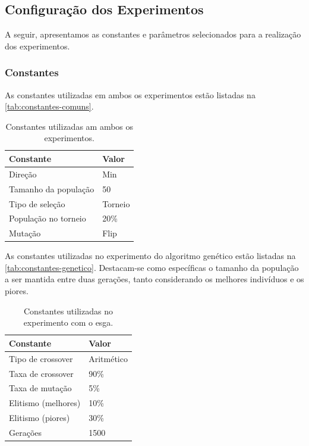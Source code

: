 \subsection{Configuração dos Experimentos}

A seguir, apresentamos as constantes e parâmetros selecionados para a realização dos experimentos.

\subsubsection{Constantes}

As constantes utilizadas em ambos os experimentos estão listadas na \autoref{tab:constantes-comuns}.

\begin{table}[htb]
    \center%
    \begin{tabular}{l l}
        \bottomrule
        \textbf{Constante}   & \textbf{Valor} \\ \midrule
        Direção              & Min            \\ \midrule
        Tamanho da população & 50             \\ \midrule
        Tipo de seleção      & Torneio        \\ \midrule
        População no torneio & 20\%           \\
        \midrule
        Mutação              & Flip           \\ \midrule
    \end{tabular}
    \caption{Constantes utilizadas am ambos os experimentos.}%
    \label{tab:constantes-comuns}
\end{table}

As constantes utilizadas no experimento do algoritmo genético estão listadas na \autoref{tab:constantes-genetico}.
Destacam-se como específicas o tamanho da população a ser mantida entre duas gerações, tanto considerando os melhores indivíduos e os piores.

\begin{table}[htb]
    \center%
    \begin{tabular}{l l}
        \bottomrule
        \textbf{Constante}  & \textbf{Valor} \\ \midrule
        Tipo de crossover   & Aritmético     \\ \midrule
        Taxa de crossover   & 90\%           \\ \midrule
        Taxa de mutação     & 5\%            \\ \midrule
        Elitismo (melhores) & 10\%           \\ \midrule
        Elitismo (piores)   & 30\%           \\ \midrule
        Gerações            & 1500           \\ \toprule
    \end{tabular}
    \caption{Constantes utilizadas no experimento com o \gls{esga}.}%
    \label{tab:constantes-genetico}
\end{table}

